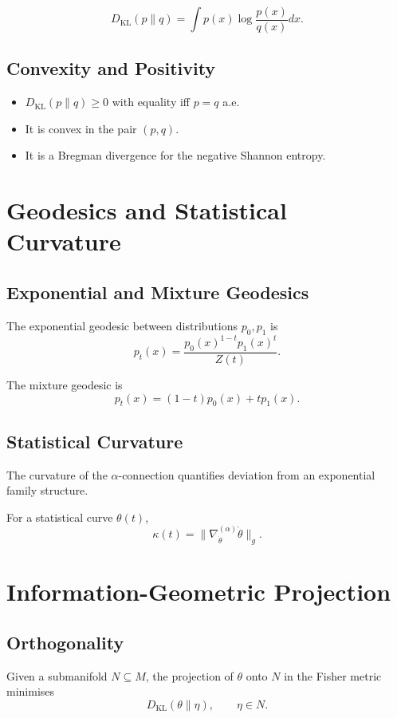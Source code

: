\[
D_{\mathrm{KL}}(p\|q)
  = \int p(x)\log\frac{p(x)}{q(x)} dx.
\]

\subsection{Convexity and Positivity}

\begin{itemize}
\item $D_{\mathrm{KL}}(p\|q)\ge 0$ with equality iff $p=q$ a.e.
\item It is convex in the pair $(p,q)$.
\item It is a Bregman divergence for the negative Shannon entropy.
\end{itemize}

\section{Geodesics and Statistical Curvature}

\subsection{Exponential and Mixture Geodesics}

The exponential geodesic between distributions $p_0, p_1$ is
\[
p_t(x)
  = \frac{p_0(x)^{1-t} p_1(x)^{t}}{Z(t)}.
\]

The mixture geodesic is
\[
p_t(x)
  = (1-t)p_0(x) + tp_1(x).
\]

\subsection{Statistical Curvature}

The curvature of the $\alpha$-connection quantifies deviation from an exponential family structure.

For a statistical curve $\theta(t)$,
\[
\kappa(t)
  = \| \nabla_{\dot{\theta}}^{(\alpha)} \dot{\theta} \|_{g}.
\]

\section{Information-Geometric Projection}

\subsection{Orthogonality}

Given a submanifold $N \subseteq M$, the projection of $\theta$ onto $N$ in the Fisher metric minimises
\[
D_{\mathrm{KL}}(\theta\|\eta), \qquad \eta \in N.
\]

